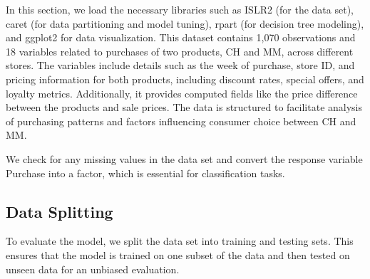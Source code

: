\documentclass[
]{article}
\newenvironment{Shaded}{\begin{snugshade}}{\end{snugshade}}
\newcommand{\AttributeTok}[1]{\textcolor[rgb]{0.13,0.29,0.53}{#1}}
\newcommand{\ConstantTok}[1]{\textcolor[rgb]{0.56,0.35,0.01}{#1}}
\newcommand{\DecValTok}[1]{\textcolor[rgb]{0.00,0.00,0.81}{#1}}
\newcommand{\FloatTok}[1]{\textcolor[rgb]{0.00,0.00,0.81}{#1}}
\newcommand{\FunctionTok}[1]{\textcolor[rgb]{0.13,0.29,0.53}{\textbf{#1}}}
\newcommand{\NormalTok}[1]{#1}
\newcommand{\OtherTok}[1]{\textcolor[rgb]{0.56,0.35,0.01}{#1}}
\newcommand{\SpecialCharTok}[1]{\textcolor[rgb]{0.81,0.36,0.00}{\textbf{#1}}}
\begin{document}
\begin{Shaded}
\end{Shaded}

In this section, we load the necessary libraries such as ISLR2 (for the
data set), caret (for data partitioning and model tuning), rpart (for
decision tree modeling), and ggplot2 for data visualization. This
dataset contains 1,070 observations and 18 variables related to
purchases of two products, CH and MM, across different stores. The
variables include details such as the week of purchase, store ID, and
pricing information for both products, including discount rates, special
offers, and loyalty metrics. Additionally, it provides computed fields
like the price difference between the products and sale prices. The data
is structured to facilitate analysis of purchasing patterns and factors
influencing consumer choice between CH and MM.

We check for any missing values in the data set and convert the response
variable Purchase into a factor, which is essential for classification
tasks.

\hypertarget{data-splitting}{%
\subsection{Data Splitting}\label{data-splitting}}

To evaluate the model, we split the data set into training and testing
sets. This ensures that the model is trained on one subset of the data
and then tested on unseen data for an unbiased evaluation.

\begin{Shaded}
\end{Shaded}
\end{document}
